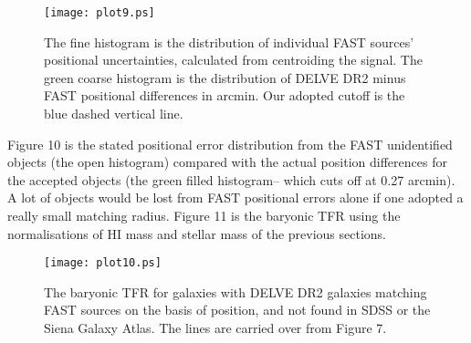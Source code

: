 \documentclass{article}
\begin{document}
\begin{figure}	
\texttt{[image: plot9.ps]}
\caption{The fine histogram is the distribution of individual FAST sources' positional uncertainties, calculated from centroiding the signal. The green coarse histogram is the distribution of DELVE DR2 minus FAST positional differences in arcmin. Our adopted cutoff is the blue dashed vertical line.}
\end{figure}
Figure 10 is the stated positional error distribution from the FAST unidentified objects (the open histogram) compared with the actual position differences for the accepted objects (the green filled histogram-- which cuts off at 0.27 arcmin). A lot of objects would be lost from FAST positional errors alone if one adopted a really small matching radius.
Figure 11 is the baryonic TFR using the normalisations of HI mass and stellar mass of the previous sections.
\begin{figure}	
\texttt{[image: plot10.ps]}
\caption{The baryonic TFR for galaxies with DELVE DR2 galaxies matching FAST sources on the basis of position, and not found in SDSS or the Siena Galaxy Atlas. The lines are carried over from Figure 7.}
\end{figure}
\clearpage
\end{document}

